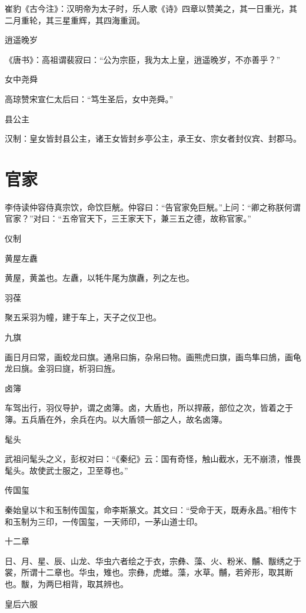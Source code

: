 \documentclass[a4paper,12pt,UTF8,twoside]{ctexbook}
\begin{document}
    崔豹《古今注》：汉明帝为太子时，乐人歌《诗》四章以赞美之，其一日重光，其二月重轮，其三星重辉，其四海重润。
    
    逍遥晚岁
    
    《唐书》：高祖谓裴寂曰：“公为宗臣，我为太上皇，逍遥晚岁，不亦善乎？”
    
    女中尧舜
    
    高琼赞宋宣仁太后曰：“笃生圣后，女中尧舜。”
    
    县公主
    
    汉制：皇女皆封县公主，诸王女皆封乡亭公主，承王女、宗女者封仪宾、封郡马。
    
    \section{官家}
    
    李侍读仲容侍真宗饮，命饮巨觥。仲容曰：“告官家免巨觥。”上问：“卿之称朕何谓官家？”对曰：“五帝官天下，三王家天下，兼三五之德，故称官家。”
    
    仪制
    
    黄屋左纛
    
    黄屋，黄盖也。左纛，以牦牛尾为旗纛，列之左也。
    
    羽葆
    
    聚五采羽为幢，建于车上，天子之仪卫也。
    
    九旗
    
    画日月曰常，画蛟龙曰旗。通帛曰旃，杂帛曰物。画熊虎曰旗，画鸟隼曰鴋，画龟龙曰旐。金羽曰旞，析羽曰旌。
    
    卤簿
    
    车驾出行，羽仪导护，谓之卤簿。卤，大盾也，所以捍蔽，部位之次，皆着之于簿。五兵盾在外，余兵在内。以大盾领一部之人，故名卤簿。
    
    髦头
    
    武祖问髦头之义，彭权对曰：“《秦纪》云：国有奇怪，触山截水，无不崩溃，惟畏髦头。故使武士服之，卫至尊也。”
    
    传国玺
    
    秦始皇以卞和玉制传国玺，命李斯篆文。其文曰：“受命于天，既寿永昌。”相传卞和玉制为三印，一传国玺，一天师印，一茅山道士印。
    
    十二章
    
    日、月、星、辰、山龙、华虫六者绘之于衣，宗彝、藻、火、粉米、黼、黻绣之于裳，所谓十二章也。华虫，雉也。宗彝，虎蜼。藻，水草。黼，若斧形，取其断也。黻，为两巳相背，取其辨也。
    
    皇后六服
    
\end{document}
